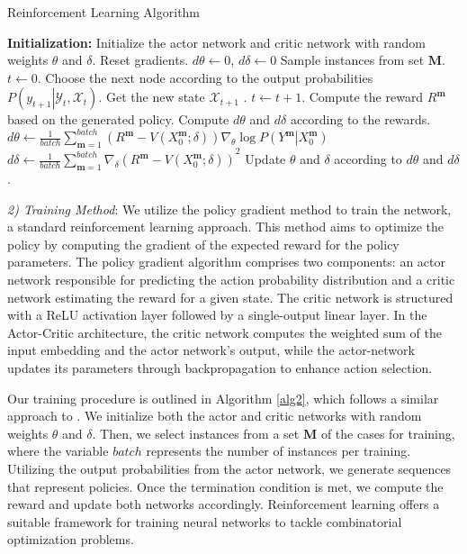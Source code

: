 \documentclass[journal]{IEEEtran}
\begin{document}
\begin{algorithm}
\caption{Reinforcement Learning Algorithm}
\label{alg2}
\begin{algorithmic}[1] 
\STATE \textbf{Initialization:} Initialize the actor network and critic network with random weights ${{\theta }}$ and ${{\delta }}$. 
\STATE Reset gradients. $d\theta \leftarrow 0$, $d\delta \leftarrow 0$
\STATE Sample instances  from set $\mathbf{M}$.
\STATE $t\leftarrow0$.
\STATE Choose the next node according to the output probabilities $P\left( \left. {{y}_{t+1}} \right|{{\mathcal Y}_{t}},{{\mathcal X}_{t}} \right)$.
\STATE Get the new state ${\mathcal X}_{t+1}$ .
\STATE $t\leftarrow t+1$.
\ENDWHILE
\STATE Compute the reward ${{R}^{\mathbf{m}}}$ based on the generated policy.
\ENDFOR
\STATE Compute $d\theta$ and $d\delta$ according to the rewards.
\STATE $d\theta \leftarrow \frac{1}{batch}\sum\limits_{\mathbf{m}=1}^{batch}{\left( {{R}^{\mathbf{m}}}-V\left( X_{0}^{\mathbf{m}};\delta  \right) \right)}{{\nabla }_{\theta }}\log P\left( \left. {{Y}^{\mathbf{m}}} \right|X_{0}^{\mathbf{m}} \right)$
\STATE $d\delta \leftarrow \frac{1}{batch}{{\sum\limits_{\mathbf{m}=1}^{batch}{{{\nabla }_{\delta }}\left( {{R}^{\mathbf{m}}}-V\left( X_{0}^{\mathbf{m}};\delta  \right) \right)}}^{2}}$
\STATE Update $\theta$ and $\delta$ according to $d\theta$ and $d\delta$.
\ENDFOR

\end{algorithmic}
\end{algorithm}

\emph{2) Training Method}:
We utilize the policy gradient method to train the network, a standard reinforcement learning approach. This method aims to optimize the policy by computing the gradient of the expected reward for the policy parameters. The policy gradient algorithm comprises two components: an actor network responsible for predicting the action probability distribution and a critic network estimating the reward for a given state. The critic network is structured with a ReLU activation layer followed by a single-output linear layer. In the Actor-Critic architecture, the critic network computes the weighted sum of the input embedding and the actor network's output, while the actor-network updates its parameters through backpropagation to enhance action selection.

Our training procedure is outlined in Algorithm \ref{alg2}, which follows a similar approach to \cite{46}. We initialize both the actor and critic networks with random weights ${{\theta }}$ and ${{\delta }}$. Then, we select instances from a set $\mathbf{M}$ of the cases for training, where the variable $batch$ represents the number of instances per training. Utilizing the output probabilities from the actor network, we generate sequences that represent policies. Once the termination condition is met, we compute the reward and update both networks accordingly. Reinforcement learning offers a suitable framework for training neural networks to tackle combinatorial optimization problems.
\end{document}
